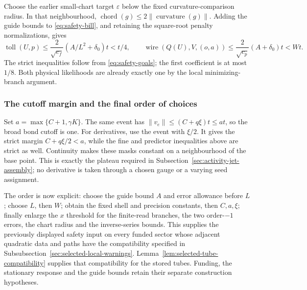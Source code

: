 Choose the earlier small-chart target $\varepsilon$ below the fixed
curvature-comparison radius. In that neighbourhood,
$\operatorname{chord}(g)\le2\|\operatorname{curvature}(g)\|$.
Adding the guide bounds to \eqref{eq:safety-bill}, and retaining the
square-root penalty normalizations, gives
\[
 \operatorname{toll}(U,p)
       \le\frac{2}{\sqrt{c_f}}(A/L^2+\delta_0)t<t/4,
 \qquad
 \operatorname{wire}(Q(U),V,(o,a))
       \le\frac{2}{\sqrt{c_p}}(A+\delta_0)t<Wt.
\]
The strict inequalities follow from \eqref{eq:safety-goals}; the first
coefficient is at most $1/8$. Both physical likelihoods are already
exactly one by the local minimizing-branch argument.

\subsubsection{The cutoff margin and the final order of choices}
Set $a=\max\{C+1,\gamma K\}$. The same event has
$\|v_e\|\le(C+q\xi)t\le at$, so the broad bond cutoff is one.
For derivatives, use the event with $\xi/2$. It gives the strict
margin $C+q\xi/2<a$, while the fine and predictor inequalities above
are strict as well. Continuity makes these masks constant on a
neighbourhood of the base point. This is exactly the plateau required
in Subsection~\ref{sec:activity-jet-assembly}; no derivative is taken
through a chosen gauge or a varying seed assignment.

The order is now explicit: choose the guide bound $A$ and error
allowance before $L$; choose $L$, then $W$; obtain the fixed shell and
precision constants, then $C,a,\xi$; finally enlarge the $x$ threshold
for the finite-read branches, the two order-$-1$ errors, the chart
radius and the inverse-series bounds. This supplies the previously
displayed safety input on every funded sector whose adjacent quadratic
data and paths have the compatibility specified in
Subsubsection~\ref{sec:selected-local-warnings}.
Lemma~\ref{lem:selected-tube-compatibility} supplies that compatibility
for the stored tubes. Funding,
the stationary response and the guide bounds retain their separate
construction hypotheses.
